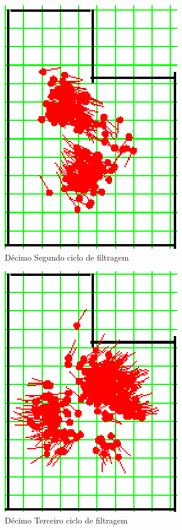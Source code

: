 \begin{figure}[H]
  \centering
  \includegraphics[scale=1]{figuras/cen1_ex3/13.eps}
  \caption[Décimo Segundo Ciclo de Filtragem]{Décimo Segundo ciclo de filtragem}
  \label{img:cen1_ex3_13}
\end{figure}

\begin{figure}[H]
  \centering
  \includegraphics[scale=1]{figuras/cen1_ex3/14.eps}
  \caption[Décimo Terceiro Ciclo de Filtragem]{Décimo Terceiro ciclo de filtragem}
  \label{img:cen1_ex3_14}
\end{figure}

